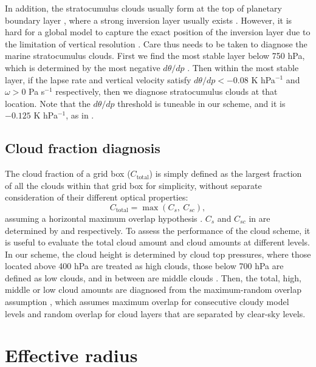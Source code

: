 In addition, the stratocumulus clouds usually form at the top of planetary boundary layer \citep{Wood2012}, where a strong inversion layer usually exists \citep{Wood2006,Park2019}. However, it is hard for a global model to capture the exact position of the inversion layer due to the limitation of vertical resolution \citep{Kawai2019}. Care thus needs to be taken to diagnose the marine stratocumulus clouds. First we find the most stable layer below 750 hPa, which is determined by the most negative $d\theta/dp$ \citep{Slingo1987}. Then within the most stable layer, if the lapse rate and vertical velocity satisfy $d\theta/dp<-0.08$ K hPa$^{-1}$ and $\omega>0$ Pa s$^{-1}$ respectively, then we diagnose stratocumulus clouds at that location. Note that the $d\theta/dp$ threshold is tuneable in our scheme, and it is $-0.125$ K hPa$^{-1}$, as in \citet{Collins2004}.

\subsection{Cloud fraction diagnosis}
\label{sec:cld_amt_diag}

The cloud fraction of a grid box ($C_\mathrm{total}$) is simply defined as the largest fraction of all the clouds within that grid box for simplicity, without separate consideration of their different optical properties:
\begin{equation}
	C_\mathrm{total}=\max(C_s, ~C_{sc}),
	\label{eq:CF_total}
\end{equation}
assuming a horizontal maximum overlap hypothesis \citep[e.g.,][]{Collins2004, Roehrig2020}. $C_s$ and $C_{sc}$ in  are determined by  and  respectively. To assess the performance of the cloud scheme, it is useful to evaluate the total cloud amount and cloud amounts at different levels. In our scheme, the cloud height is determined by cloud top pressures, where those located above 400 hPa are treated as high clouds, those below 700 hPa are defined as low clouds, and in between are middle clouds \citep{Collins2004}. Then, the total, high, middle or low cloud amounts are diagnosed from the maximum-random overlap assumption \citep{Morcrette2000}, which assumes maximum overlap for consecutive cloudy model levels and random overlap for cloud layers that are separated by clear-sky levels.

\section{Effective radius}

